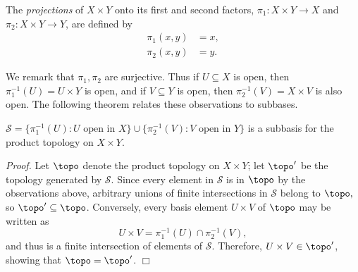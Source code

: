\begin{definition}\label{2.11}
    The {\it projections} of $X \times Y$ onto its first and second factors, $\pi_1:X \times Y \rightarrow X$ and $\pi_2: X \times Y \rightarrow Y$, are defined by
    \begin{align*}
        \pi_1(x, y) &= x, \\
        \pi_2(x, y) &= y.
    \end{align*}
\end{definition}
We remark that $\pi_1, \pi_2$ are surjective. Thus if $U \subseteq X$ is open, then $\pi_1^{-1}(U)= U \times Y$ is open, and if $V \subseteq Y$ is open, then $\pi_2^{-1} (V) = X \times V$ is also open. The following theorem relates these observations to subbases.
\begin{theorem}\label{2.12}
    $\mathcal{S} = \{\pi_1^{-1}(U): U \text{ open in } X\} \cup \{\pi_2^{-1}(V): V \text{ open in } Y\}$ is a subbasis for the product topology on $X \times Y$.
\end{theorem}
{\it Proof.} Let $\topo$ denote the product topology on $X \times Y$; let $\topo'$ be the topology generated by $\mathcal{S}$. Since every element in $\mathcal{S}$ is in $\topo$ by the observations above, arbitrary unions of finite intersections in $\mathcal{S}$ belong to $\topo,$ so $\topo' \subseteq \topo$. Conversely, every basis element $U \times V$ of $\topo$ may be written as
$$U \times V = \pi_1^{-1}(U) \cap \pi_2^{-1} (V),$$
and thus is a finite intersection of elements of $\mathcal{S}$. Therefore, $U \times V \in \topo'$, showing that $\topo = \topo'$. $\Box$

